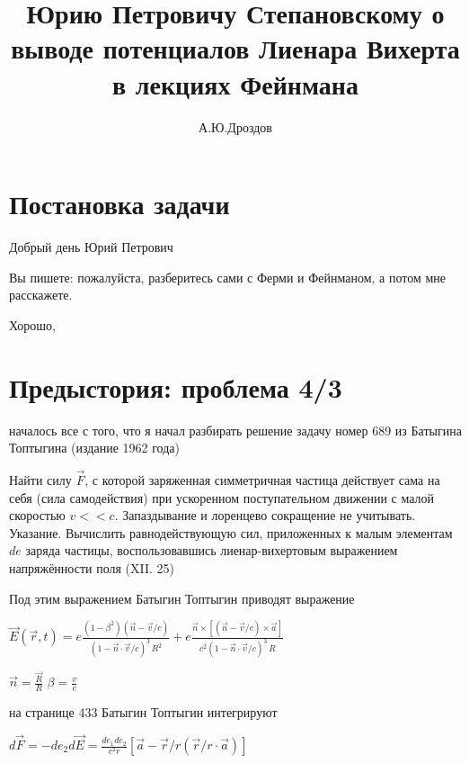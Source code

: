 \documentclass{article}
\begin{document}
\title{Юрию Петровичу Степановскому о выводе потенциалов Лиенара Вихерта в лекциях Фейнмана}

\author{А.Ю.Дроздов}



\begin{titlepage}
\maketitle
\end{titlepage}


\section{Постановка задачи}

Добрый день Юрий Петрович

Вы пишете:  пожалуйста, разберитесь сами с Ферми и Фейнманом, а потом мне расскажете.

Хорошо, 

\section{ Предыстория: проблема 4/3}

 началось все с того, что я начал разбирать решение задачу номер 689 из Батыгина Топтыгина (издание 1962 года)


Найти силу $\vec{F}$, с которой заряженная симметричная частица действует сама на себя (сила самодействия) при ускоренном поступательном движении с малой скоростью $v << c$. Запаздывание и лоренцево сокращение не учитывать.
Указание. Вычислить равнодействующую сил, приложенных к малым элементам $de$ заряда частицы, воспользовавшись лиенар-вихертовым выражением напряжённости поля (XII. 25)  

Под этим выражением Батыгин Топтыгин приводят выражение

$\vec{E}\left(\vec{r},t\right) = e \frac{\left(1-\beta^2\right) \left(\vec{n}-\vec{v}/c \right)}{\left(1-\vec{n}\cdot\vec{v}/c\right)^3\,R^2} + e \frac{ \vec{n} \times \left[ \left( \vec{n}-\vec{v}/c\right) \times \vec{a}\right]}{c^2 \left(1-\vec{n} \cdot \vec{v}/c \right)^3 \,R }$

$\vec{n}=\frac{\vec{R}}{R}$ $\beta=\frac{v}{c}$

на странице 433 Батыгин Топтыгин интегрируют

$d\vec{F} = - d e_2 d\vec{E} = \frac{de_1 de_2}{c^2 r} \left[ \vec{a} - \vec{r}/r\left( \vec{r}/r \cdot \vec{a}\right) \right]$
\end{document}

